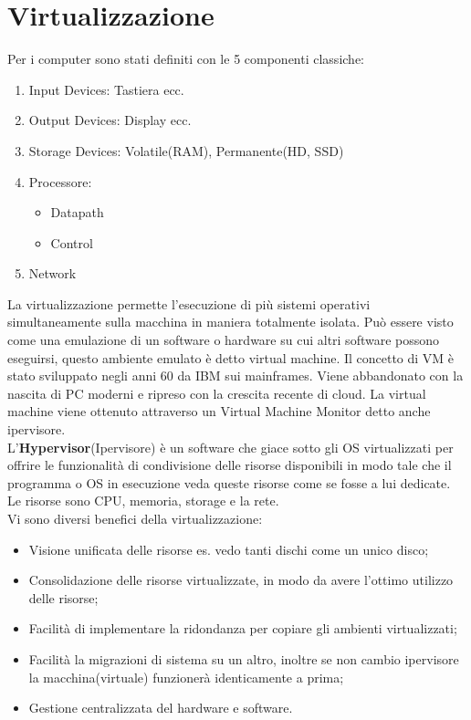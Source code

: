 \documentclass[11pt, twocolumn]{article}
\newenvironment{myitemize}
{ \begin{itemize}
		\setlength{\itemsep}{0pt}
		\setlength{\parskip}{0pt}
		\setlength{\parsep}{0pt}     }
	{ \end{itemize}                  }
\newenvironment{myenumerate}
{ \begin{enumerate}
		\setlength{\itemsep}{0pt}
		\setlength{\parskip}{0pt}
		\setlength{\parsep}{0pt}     }
	{ \end{enumerate}                  }
\begin{document}
\section{Virtualizzazione}
Per i computer sono stati definiti con le 5 componenti classiche:
\begin{myenumerate}
	\item Input Devices: Tastiera ecc.
	\item Output Devices: Display ecc.
	\item Storage Devices: Volatile(RAM), Permanente(HD, SSD)
	\item Processore:
	\begin{myitemize}
		\item Datapath
		\item Control
	\end{myitemize}
	\item Network
\end{myenumerate}
La virtualizzazione permette l'esecuzione di più sistemi operativi simultaneamente sulla macchina in maniera totalmente isolata. 
Può essere visto come una emulazione di un software o hardware su cui altri software possono eseguirsi, questo ambiente emulato è detto virtual machine.
Il concetto di VM è stato sviluppato negli anni 60 da IBM sui mainframes.
Viene abbandonato con la nascita di PC moderni e ripreso con la crescita recente di cloud. La virtual machine viene ottenuto attraverso un Virtual Machine Monitor detto anche ipervisore.\\
L'\textbf{Hypervisor}(Ipervisore) è un software che giace sotto gli OS virtualizzati per offrire le funzionalità di condivisione delle risorse disponibili in modo tale che il programma o OS in esecuzione veda queste risorse come se fosse a lui dedicate. 
Le risorse sono CPU, memoria, storage e la rete.\\
Vi sono diversi benefici della virtualizzazione:
\begin{myitemize}
	\item Visione unificata delle risorse es. vedo tanti dischi come un unico disco;
	\item Consolidazione delle risorse virtualizzate, in modo da avere l'ottimo utilizzo delle risorse;
	\item Facilità di implementare la ridondanza per copiare gli ambienti virtualizzati;
	\item Facilità la migrazioni di sistema su un altro, inoltre se non cambio ipervisore la macchina(virtuale) funzionerà identicamente a prima;
	\item Gestione centralizzata del hardware e software.
\end{myitemize}
\end{document}
